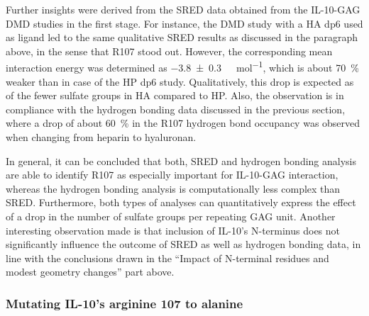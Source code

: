 Further insights were derived from the SRED data obtained from the IL-10-GAG DMD
studies in the first stage. For instance, the DMD study with a HA dp6 used as
ligand led to the same qualitative SRED results as discussed in the paragraph
above, in the sense that R107 stood out. However, the corresponding mean
interaction energy was determined as \SI{-3.8 +-0.3}{\kilo\calory\per\mol},
which is about \SI{70}{\percent} weaker than in case of the HP dp6 study.
Qualitatively, this drop is expected as of the fewer sulfate groups in HA
compared to HP. Also, the observation is in compliance with the hydrogen bonding
data discussed in the previous section, where a drop of about \SI{60}{\percent}
in the R107 hydrogen bond occupancy was observed when changing from heparin to
hyaluronan.

In general, it can be concluded that both, SRED and hydrogen bonding analysis
are able to identify R107 as especially important for IL-10-GAG interaction,
whereas the hydrogen bonding analysis is computationally less complex than SRED.
Furthermore, both types of analyses can quantitatively express the effect of a
drop in the number of sulfate groups per repeating GAG unit. Another interesting
observation made is that inclusion of IL-10's N-terminus does not significantly
influence the outcome of SRED as well as hydrogen bonding data, in line with the
conclusions drawn in the \enquote{Impact of N-terminal residues and modest
geometry changes} part above.



\subsubsection{Mutating IL-10's arginine 107 to alanine}

